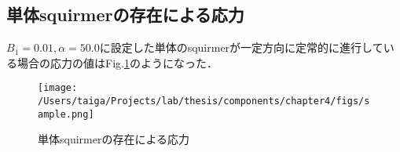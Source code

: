 \subsection{単体squirmerの存在による応力}

$B_1 = 0.01, \alpha = 50.0$に設定した単体のsquirmerが一定方向に定常的に進行している場合の応力の値はFig.\ref{fig:squirmer_stresslet_results}のようになった．

\begin{figure}[htbp]
    \centering
    \texttt{[image: /Users/taiga/Projects/lab/thesis/components/chapter4/figs/sample.png]}
    \caption{単体squirmerの存在による応力}
    \label{fig:squirmer_stresslet_results}
\end{figure}
